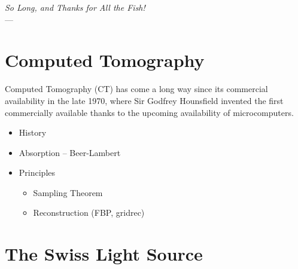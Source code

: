 \label{ch:ct}
\begin{flushright}{\slshape    
		So Long, and Thanks for All the Fish!} \\ \medskip
    ---  \citep{Adams1984}
\end{flushright}
\bigskip

\section{Computed Tomography}
Computed Tomography (\acs{CT}) has come a long way since its commercial availability in the late 1970, where Sir Godfrey Hounsfield invented the first commercially available thanks to the upcoming availability of microcomputers.

\begin{itemize}
    \item History
    \item Absorption -- Beer-Lambert
    \item Principles
    \begin{itemize}
        \item Sampling Theorem
        \item Reconstruction (FBP, gridrec)
    \end{itemize}
\end{itemize}

\section{The Swiss Light Source}

